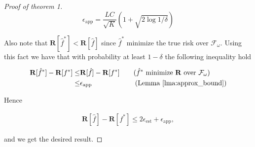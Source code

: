 \documentclass{article}
\begin{document}
\begin{proof}[Proof of theorem 1]
     \begin{equation*}
         \epsilon_{\text{app}} = \frac{LC}{\sqrt{K}} \left(1+\sqrt{2 \log 1/\delta} \right)
     \end{equation*}
     
     Also note that $\mathbf{R}[\hat{f}^*]<\mathbf{R}[\hat{f}]$ since $\hat{f}^*$ minimize the true risk over $\mathcal{F}_\omega$. Using this fact we have that with probability at least $1-\delta$ the following inequality hold
     
     \begin{align*}
         \mathbf{R}[\hat{f}^*]-\mathbf{R}[f^*]
         \leq& \mathbf{R}[\hat{f}]-\mathbf{R}[f^*] \quad\quad \text{($\hat{f}^*$ minimize $\mathbf{R}$ over $\mathcal{F}_\omega$)}\\
         \leq& \epsilon_{\text{app}} \quad\hspace{52.5pt}\text{(Lemma \ref{lma:approx_bound})}
     \end{align*}
     
     Hence
     
     \begin{align}
        \mathbf{R}[\hat{f}]-\mathbf{R}[f^*] 
        \leq 2\epsilon_{\text{est}} + \epsilon_{\text{app}},
    \end{align}
    
    and we get the desired result.
\end{proof}


    \nocite{*}
    
    
\end{document}
